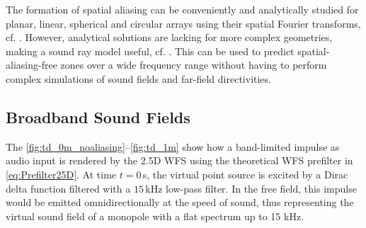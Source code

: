%
The formation of spatial aliasing can be conveniently and analytically
studied for planar, linear, spherical and circular arrays using their
spatial Fourier transforms, cf. \cite{Start1997_diss,Spors2008b,Ahrens2010_IEEE,
Fazi2010,Schultz2016_diss, Firtha2019_diss}.
However, analytical solutions are lacking for more complex geometries,
making a sound ray model useful, cf. \cite{Winter2019_diss}.
%
This can be used to predict spatial-aliasing-free zones over a wide
frequency range without having to perform complex simulations of
sound fields and far-field directivities.



\subsection{Broadband Sound Fields}

The \myfigs\ref{fig:td_0m_noaliasing}--\ref{fig:td_1m}
show how a band-limited impulse as audio input is rendered by
the 2.5D WFS using the theoretical WFS prefilter
in \myeq\eqref{eq:Prefilter25D}.
%
At time $t=0$\,s, the virtual point source is excited by a Dirac delta function
filtered with a $15$\,kHz low-pass filter.
In the free field, this impulse would be emitted omnidirectionally at the speed
of sound, thus representing the virtual sound field of a monopole with a flat
spectrum up to 15 kHz.



